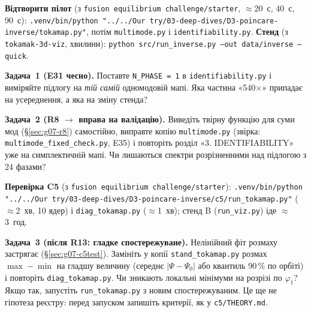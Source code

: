 \begin{practicum}
\textbf{Відтворити пілот} (з \texttt{fusion equilibrium challenge/starter}, $\approx$20~с, 40~с, 90~с): \texttt{.venv/bin/python "../../Our try/03-deep-dives/D3-poincare-inverse/tokamap.py"}, потім \texttt{multimode.py} і \texttt{identifiability.py}. \textbf{Стенд} (з \texttt{tokamak-3d-viz}, хвилини): \texttt{python src/run\_inverse.py --out data/inverse --quick}.

\textbf{Задача~1 (E31 чесно).} Поставте \texttt{N\_PHASE = 1} в \texttt{identifiability.py} і виміряйте підлогу на \emph{тій самій} одномодовій мапі. Яка частина «540$\times$» припадає на усереднення, а яка на зміну стенда?

\textbf{Задача~2 (R8 $\to$ вправа на валідацію).} Виведіть твірну функцію для суми мод (\S\ref{sec:g07-r8}) самостійно, виправте копію \texttt{multimode.py} (звірка: \texttt{multimode\_fixed\_check.py}, E35) і повторіть розділ «3. IDENTIFIABILITY» уже на симплектичній мапі. Чи лишаються спектри розрізненними над підлогою з 24 фазами?

\textbf{Перевірка C5} (з \texttt{fusion equilibrium challenge/starter}): \texttt{.venv/bin/python "../../Our try/03-deep-dives/D3-poincare-inverse/c5/run\_tokamap.py"} ($\approx$2~хв, 10 ядер) і \texttt{diag\_tokamap.py} ($\approx$1~хв); стенд B (\texttt{run\_viz.py}) іде $\approx$3~год.

\textbf{Задача~3 (після R13: гладке спостережуване).} Нелінійний фіт розмаху застрягає (\S\ref{sec:g07-c5test}). Замініть у копії \texttt{stand\_tokamap.py} розмах $\max-\min$ на гладшу величину (середнє $|\Psi-\Psi_0|$ або квантиль 90\,\% по орбіті) і повторіть \texttt{diag\_tokamap.py}. Чи зникають локальні мінімуми на розрізі по $\varphi_1$? Якщо так, запустіть \texttt{run\_tokamap.py} з новим спостережуваним. Це ще не гіпотеза реєстру: перед запуском запишіть критерії, як у \texttt{c5/THEORY.md}.
\end{practicum}
